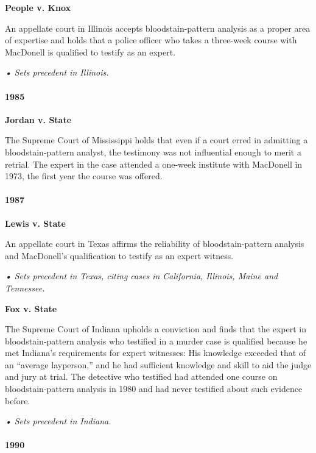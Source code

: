 \textbf{People v. Knox}

An appellate court in Illinois accepts bloodstain-pattern analysis as a
proper area of expertise and holds that a police officer who takes a
three-week course with MacDonell is qualified to testify as an expert.

\emph{• Sets precedent in Illinois.}

\hypertarget{1985}{%
\paragraph{1985}\label{1985}}

\textbf{Jordan v. State}

The Supreme Court of Mississippi holds that even if a court erred in
admitting a bloodstain-pattern analyst, the testimony was not
influential enough to merit a retrial. The expert in the case attended a
one-week institute with MacDonell in 1973, the first year the course was
offered.

\hypertarget{1987}{%
\paragraph{1987}\label{1987}}

\textbf{Lewis v. State}

An appellate court in Texas affirms the reliability of
bloodstain-pattern analysis and MacDonell's qualification to testify as
an expert witness.

\emph{• Sets precedent in Texas, citing cases in California, Illinois,
Maine and Tennessee.}

\textbf{Fox v. State}

The Supreme Court of Indiana upholds a conviction and finds that the
expert in bloodstain-pattern analysis who testified in a murder case is
qualified because he met Indiana's requirements for expert witnesses:
His knowledge exceeded that of an ``average layperson,'' and he had
sufficient knowledge and skill to aid the judge and jury at trial. The
detective who testified had attended one course on bloodstain-pattern
analysis in 1980 and had never testified about such evidence before.

\emph{• Sets precedent in Indiana.}

\hypertarget{1990}{%
\paragraph{1990}\label{1990}}

